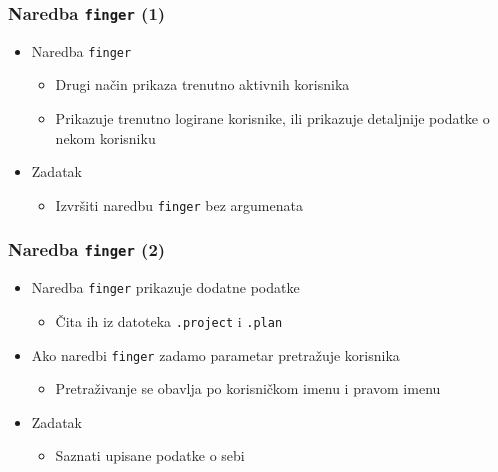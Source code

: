 \documentclass{beamer}
\newcommand{\shell}[1]{\texttt{#1}}
\begin{document}
\begin{frame}[t]
\frametitle{Naredba \shell{finger} (1)}
\begin{itemize}
  \item Naredba \shell{finger}
  \begin{itemize}
    \item Drugi način prikaza trenutno aktivnih korisnika
    \item Prikazuje trenutno logirane korisnike, ili prikazuje 
          detaljnije podatke o nekom korisniku
  \end{itemize}
  \item Zadatak
  \begin{itemize}
    \item Izvršiti naredbu \shell{finger} bez argumenata
  \end{itemize}
\end{itemize}
\end{frame}

\begin{frame}[t]
\frametitle{Naredba \shell{finger} (2)}
\begin{itemize}
  \item Naredba \shell{finger} prikazuje dodatne podatke
  \begin{itemize}
    \item Čita ih iz datoteka \shell{.project} i \shell{.plan}
  \end{itemize}
  \item Ako naredbi \shell{finger} zadamo parametar pretražuje korisnika
  \begin{itemize}
    \item Pretraživanje se obavlja po korisničkom imenu i pravom imenu
  \end{itemize}
  \item Zadatak
  \begin{itemize}
    \item Saznati upisane podatke o sebi
  \end{itemize}
\end{itemize}
\end{frame}
\end{document}
